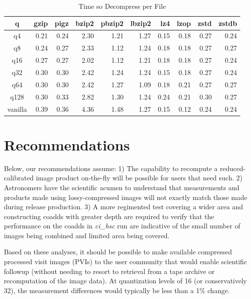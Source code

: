 \begin{table}
\caption{Time so Decompress per File}
\centering
\begin{tabular}[]{crrrrrrrrr}
\hline
 q        &  gzip & pigz & bzip2 & pbzip2 & lbzip2 & lz4 & lzop & zstd & zstdb  \\
\hline
 q4       &    0.21 &   0.24 &   2.30 &   1.21 &   1.27 &   0.15 &   0.18 &   0.27 &   0.24  \\
 q8       &    0.24 &   0.27 &   2.33 &   1.12 &   1.24 &   0.18 &   0.18 &   0.27 &   0.27  \\
 q16      &    0.27 &   0.27 &   2.02 &   1.12 &   1.21 &   0.18 &   0.18 &   0.27 &   0.24  \\
 q32      &    0.30 &   0.30 &   2.42 &   1.24 &   1.24 &   0.15 &   0.18 &   0.27 &   0.24  \\
 q64      &    0.30 &   0.30 &   2.42 &   1.27 &   1.09 &   0.18 &   0.21 &   0.27 &   0.27  \\
 q128     &    0.30 &   0.33 &   2.82 &   1.30 &   1.24 &   0.24 &   0.21 &   0.30 &   0.27  \\
 vanilla  &    0.39 &   0.36 &   4.36 &   1.48 &   1.27 &   0.15 &   0.12 &   0.24 &   0.24  \\
\hline
\end{tabular}
\label{timing_decompress}
\end{table}




\section{Recommendations}

Below, our recommendations assume:
1) The capability to recompute a reduced-calibrated image product on-the-fly will be possible for users that need such.
2) Astronomers have the scientific acumen to understand that measurements and products made using lossy-compressed images will not exactly match those made during release production.
3) A more regimented test covering a wider area and constructing coadds with greater depth are required to verify that the performance on the coadds in {\it ci\_hsc} run are indicative of the small number of images being combined and limited area being covered.

Based on these analyses, it should be possible to make available compressed processed visit images (PVIs) 
to the user community that would enable scientific followup (without needing to resort to retrieval
from a tape archive or recomputation of the image data).  At quantization levels of 16 (or conservatively 32),
the measurement differences would typically be less than a 1\% change.


